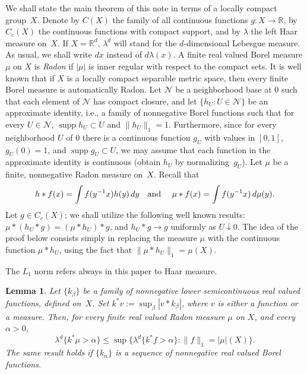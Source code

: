 \documentclass[12pt,a4paper]{amsart}
\newcommand{\supp}{\operatorname{supp}} %
\theoremstyle{plain}
\newtheorem{lem}{Lemma}
\theoremstyle{remark}
\begin{document}
We shall state the main theorem of this note in terms of a
locally compact group~$X$.
Denote by $C(X)$ the family of all continuous
functions $g \colon X\to \mathbb{R}$, by $C_c(X)$ the continuous
functions with compact support, and by $\lambda$ the left Haar
measure on~$X$. If $X = \mathbb{R}^d$,
$\lambda^d$ will stand for the $d$-dimensional Lebesgue
measure. As usual, we shall write $dx$ instead of $d\lambda (x)$.
A finite real valued Borel measure $\mu$ on $X$ is \emph{Radon} if
$|\mu|$ is inner
regular with respect to the compact sets. It is well
known that if $X$ is a locally compact separable metric space, then
every finite Borel measure is automatically Radon.
Let $\mathcal{N}$ be a neighborhood base at $0$ such that each element
of $\mathcal{N}$ has compact closure, and let
$\{h_U : U \in \mathcal{N}\}$ be an approximate identity, i.e.,
a family of nonnegative Borel functions such that for every
$U \in \mathcal{N}$, $\supp h_U \subset U$ and $\|h_U\|_1 =1$.
Furthermore, since for every neighborhood $U$ of $0$ there
is a continuous function $g_U$ with values in $[0,1]$,
$g_U(0) = 1$, and $\supp g_U \subset U$, we may assume that each
function in the approximate identity is continuous (obtain $h_U$
by normalizing~$g_U$).
Let $\mu$ be a finite, nonnegative Radon measure on~$X$.
Recall that
\[
    h*f(x) = \int f(y^{-1}x) h(y) \, dy
    \text{\quad and \quad}
    \mu*f(x) = \int f(y^{-1}x) \, d\mu(y).
\]
Let $g\in C_c(X)$;
we shall utilize the following well known results:
$\mu*(h_U*g) = (\mu*h_U)*g$, and
$h_U*g \to g$ uniformly as $U \downarrow 0$.
The idea of the proof below consists simply in replacing the measure
$\mu$ with the continuous function $\mu*h_U$, using the fact that
$\| \mu*h_U \|_1 = \mu(X)$.

The $L_1$ norm refers always in this paper to Haar measure.

\begin{lem}
\label{lem:family}
Let $\{k_{\beta}\}$ be a family of
nonnegative lower semicontinuous real valued functions, defined
on~$X$. Set $k^*v := \sup_{\beta}|v*k_{\beta}|$, where $v$ is either a
function or a measure. Then, for every
finite real valued Radon measure $\mu$ on $X$,
and every $\alpha > 0$,
\[
    \lambda^d \{k^* \mu > \alpha\} \le
    \sup \big\{ \lambda^d \{k^* f > \alpha\} : \|f\|_1 = |\mu|(X) \big\}.
\]
The same result holds if $\{k_n\}$ is a sequence of
nonnegative real valued Borel functions.
\end{lem}
\end{document}
